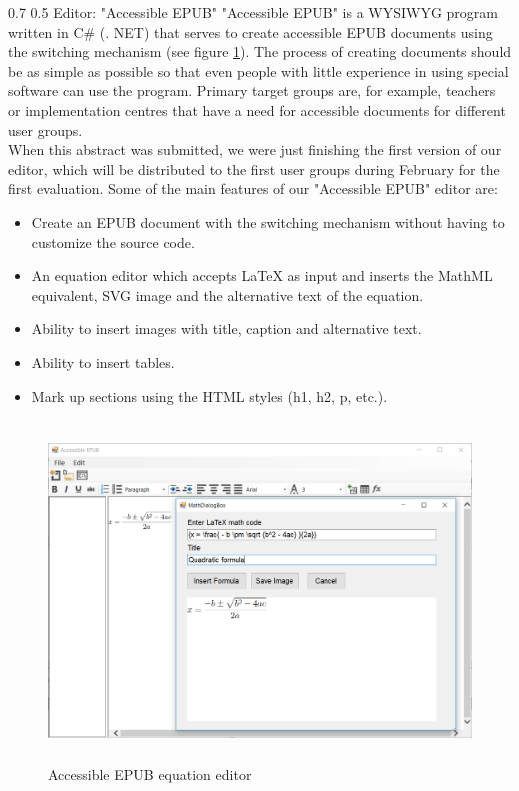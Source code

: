\documentclass[12pt]{llncs}
\makeatletter
\renewcommand\subsection{\@startsection 
   {subsection}{2}{0mm}%
   {0.7\baselineskip}%
   {0.5\baselineskip}%
   {\bfseries\large}%
   }
\makeatother
\begin{document}
\subsection{Editor: "Accessible EPUB"}
"Accessible EPUB" is a WYSIWYG program written in C\# (. NET) that serves to create accessible EPUB documents using the switching mechanism (see figure \ref{fig:editor}). The process of creating documents should be as simple as possible so that even people with little experience in using special software can use the program. Primary target groups are, for example, teachers or implementation centres that have a need for accessible documents for different user groups.\\
When this abstract was submitted, we were just finishing the first version of our editor, which will be distributed to the first user groups during February for the first evaluation.
Some of the main features of our "Accessible EPUB" editor are:
\begin{itemize}
	\item Create an EPUB document with the switching mechanism without having to customize the source code.
	\item An equation editor which accepts LaTeX as input and inserts the MathML equivalent, SVG image and the alternative text of the equation.
	\item Ability to insert images with title, caption and alternative text.
	\item Ability to insert tables.
	\item Mark up sections using the HTML styles (h1, h2, p, etc.).
\end{itemize}
\vspace{-0.6cm} 
\begin{figure}
	\centering
	\includegraphics[height=90mm]{AccessibleEPUBequation.PNG}
	\caption{Accessible EPUB equation editor}
    \label{fig:editor}
\end{figure}
\end{document}
